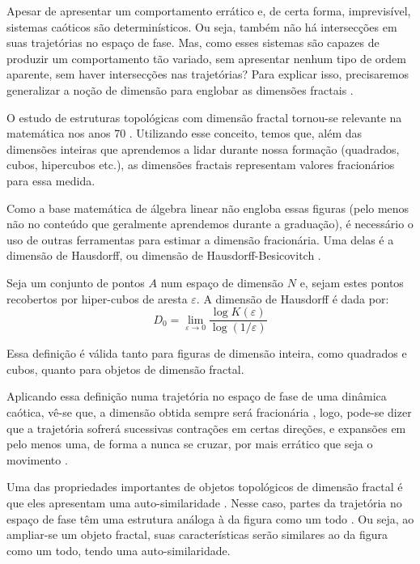 \documentclass[a4paper, 12pt]{article}
\begin{document}
Apesar de apresentar um comportamento errático e, de certa forma, imprevisível, sistemas caóticos são determinísticos. Ou seja, também não há intersecções em suas trajetórias no espaço de fase. Mas, como esses sistemas são capazes de produzir um comportamento tão variado, sem apresentar nenhum tipo de ordem aparente, sem haver intersecções nas trajetórias? Para explicar isso, precisaremos generalizar a noção de dimensão para englobar as dimensões fractais \cite{mandelbrot1967long}. 

O estudo de estruturas topológicas com dimensão fractal tornou-se relevante na matemática nos anos 70 \cite{gleick2008chaos}. Utilizando esse conceito, temos que, além das dimensões inteiras que aprendemos a lidar durante nossa formação (quadrados, cubos, hipercubos etc.), as dimensões fractais representam valores fracionários para essa medida.

Como a base matemática de álgebra linear não engloba essas figuras (pelo menos não no conteúdo que geralmente aprendemos durante a graduação), é necessário o uso de outras ferramentas para estimar a dimensão fracionária. Uma delas é a dimensão de Hausdorff, ou dimensão de Hausdorff-Besicovitch \cite{attux2001dinamica, fiedler1994caos}.

Seja um conjunto de pontos $A$ num espaço de dimensão $N$ e, sejam estes pontos recobertos por hiper-cubos de aresta $\varepsilon$. A dimensão de Hausdorff é dada por:
\begin{equation}
D_0 = \lim_{\varepsilon \rightarrow 0} \frac{\log K (\varepsilon)}{\log (1/\varepsilon)}
\end{equation}

Essa definição é válida tanto para figuras de dimensão inteira, como quadrados e cubos, quanto para objetos de dimensão fractal.

Aplicando essa definição numa trajetória no espaço de fase de uma dinâmica caótica, vê-se que, a dimensão obtida sempre será fracionária \cite{fiedler1994caos}, logo, pode-se dizer que a trajetória sofrerá sucessivas contrações em certas direções, e expansões em pelo menos uma, de forma a nunca se cruzar, por mais errático que seja o movimento \cite{fiedler1994caos}.

Uma das propriedades importantes de objetos topológicos de dimensão fractal é que eles apresentam uma auto-similaridade \cite{gleick2008chaos}. Nesse caso, partes da trajetória no espaço de fase têm uma estrutura análoga à da figura como um todo \cite{attux2001dinamica}. Ou seja, ao ampliar-se um objeto fractal, suas características serão similares ao da figura como um todo, tendo uma auto-similaridade.
\end{document}
